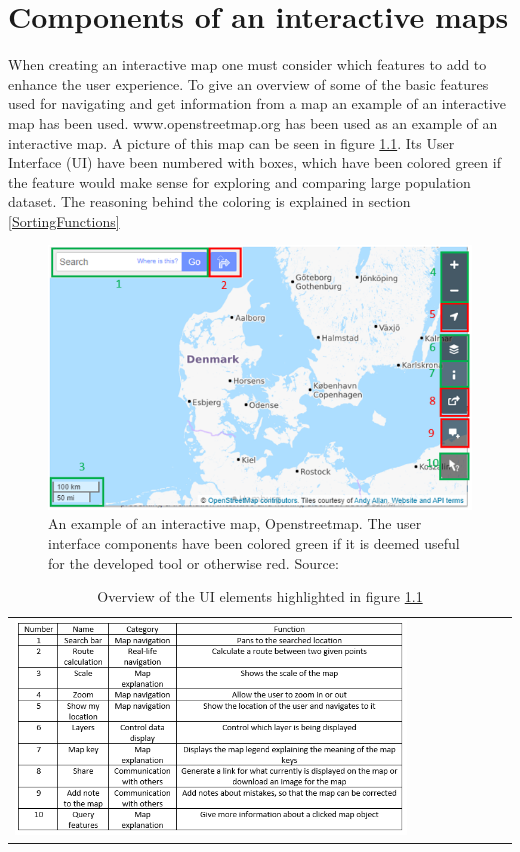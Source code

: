 \chapter{Components of an interactive maps}\label{CInteractiveMap}
When creating an interactive map one must consider which features to add to enhance the user experience. To give an overview of some of the basic features used for navigating and get information from a map an example of an interactive map has been used. www.openstreetmap.org has been used as an example of an interactive map. \citep{OpenStreetMap} A picture of this map can be seen in figure \ref{InteractiveMap}. Its User Interface (UI) have been numbered with boxes, which have been colored green if the feature would make sense for exploring and comparing large population dataset. The reasoning behind the coloring is explained in section \ref{SortingFunctions}


\begin{figure} [H]
	\centering
	\includegraphics[width=.8\textwidth]{Pictures/InteractiveMap}
	\caption{An example of an interactive map, Openstreetmap. The user interface components have been colored green if it is deemed useful for the developed tool or otherwise red. Source: \citep{OpenStreetMap}}
	\label{InteractiveMap}
\end{figure}
\begin{table}[htbp]
	\centering
	\begin{tabular}{l}
		\includegraphics[width=0.8\textwidth]{Pictures/tabOSMFunctions}
	\end{tabular}
	\caption{Overview of the UI elements highlighted in figure \ref{InteractiveMap}}
	\label{tabOSMFunctions}
\end{table}

